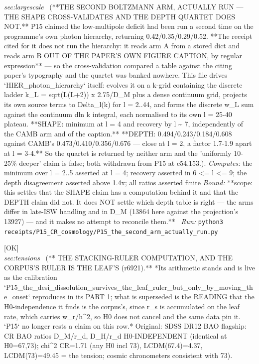 \begin{description}
\textit{sec:largescale} \ (**THE SECOND BOLTZMANN ARM, ACTUALLY RUN --- THE SHAPE CROSS-VALIDATES AND THE DEPTH QUARTET DOES NOT.** P15 claimed the low-multipole deficit had been run a second time on the programme's own photon hierarchy, returning 0.42/0.35/0.29/0.52. **The receipt cited for it does not run the hierarchy: it reads arm A from a stored dict and reads arm B OUT OF THE PAPER'S OWN FIGURE CAPTION, by regular expression** --- so the cross-validation compared a table against the citing paper's typography and the quartet was banked nowhere. This file drives `HIER\_photon\_hierarchy` itself: evolves it on a k-grid containing the discrete ladder k\_L = sqrt(L(L+2)) x 2.75/D\_M plus a dense continuum grid, projects its own source terms to Delta\_l(k) for l = 2..44, and forms the discrete w\_L sum against the continuum dln k integral, each normalised to its own l = 25-40 plateau. **SHAPE: minimum at l = 4 and recovery by l \textasciitilde{} 7, independently of the CAMB arm and of the caption.** **DEPTH: 0.494/0.243/0.184/0.608 against CAMB's 0.473/0.410/0.356/0.676 --- close at l = 2, a factor 1.7-1.9 apart at l = 3-4.** So the quartet is returned by neither arm and the 'uniformly 10-25\% deeper' claim is false; both withdrawn from P15 at c54.153.). 
\emph{Computes:} the minimum over l = 2..5 asserted at l = 4; recovery asserted in 6 <= l <= 9; the depth disagreement asserted above 1.4x; all ratios asserted finite
 \emph{Bound:} **scope: this settles that the SHAPE claim has a computation behind it and that the DEPTH claim did not. It does NOT settle which depth table is right --- the arms differ in late-ISW handling and in D\_M (13864 here against the projection's 13927) --- and it makes no attempt to reconcile them.**
\ \emph{Run:} \texttt{python3 receipts/P15\_CR\_cosmology/P15\_the\_second\_arm\_actually\_run.py}
\item[\rcptlabel{P15_hubble_expansion_confrontation_v2}{P15R37}\textbf{P15R37}\quad\texttt{P15\_hubble\_expansion\_confrontation\_v2}]\hfill\textsf{[OK]}\\
\textit{sec:tensions} \ (** THE STACKING-RULER COMPUTATION, AND THE CORPUS'S RULER IS THE LEAF'S (r6921).** *Its arithmetic stands and is live as the calibration `P15\_the\_desi\_dissolution\_survives\_the\_leaf\_ruler\_but\_only\_by\_moving\_the\_onset` reproduces in its PART 1; what is superseded is the READING that the H0-independence it finds is the corpus's, since r\_s is accumulated on the leaf rate, which carries w\_r/h\textasciicircum{}2, so H0 does not cancel and the same data pin it. `P15` no longer rests a claim on this row.* Original: SDSS DR12 BAO flagship: CR BAO ratios D\_M/r\_d, D\_H/r\_d H0-INDEPENDENT (identical at H0=67,73); chi\textasciicircum{}2 CR=1.71 (any H0 incl 73), LCDM(67.4)=4.37, LCDM(73)=49.45 = the tension; cosmic chronometers consistent with 73). 

\end{description}
